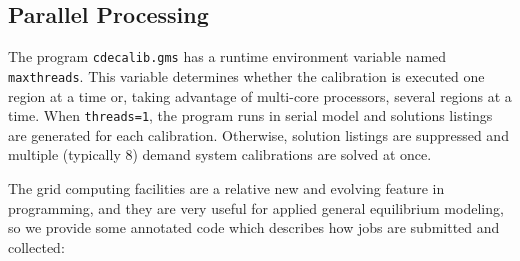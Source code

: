 \subsection*{Parallel Processing}

The \GAMS program \texttt{cdecalib.gms} has a runtime environment
variable named \texttt{maxthreads}.  This variable determines whether
the \CDE calibration is executed one region at a time or, taking
advantage of multi-core processors, several regions at a time.  When
\texttt{threads=1}, the program runs in serial model and solutions
listings are generated for each calibration.  Otherwise, solution
listings are suppressed and multiple (typically 8) demand system
calibrations are solved at once.

The grid computing facilities are a relative new and evolving feature
in \GAMS programming, and they are very useful for applied general
equilibrium modeling, so we provide some annotated \GAMS code which
describes how jobs are submitted and collected:
